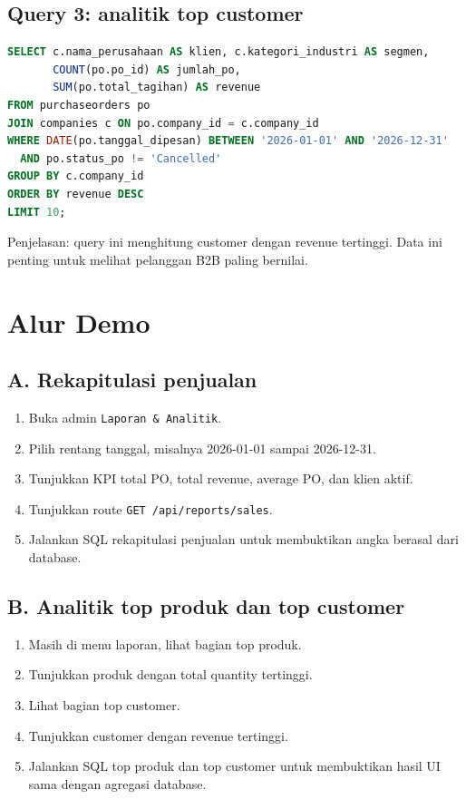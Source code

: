 \documentclass[11pt,a4paper]{article}
\begin{document}
\subsection*{Query 3: analitik top customer}
\begin{lstlisting}[language=SQL]
SELECT c.nama_perusahaan AS klien, c.kategori_industri AS segmen,
       COUNT(po.po_id) AS jumlah_po,
       SUM(po.total_tagihan) AS revenue
FROM purchaseorders po
JOIN companies c ON po.company_id = c.company_id
WHERE DATE(po.tanggal_dipesan) BETWEEN '2026-01-01' AND '2026-12-31'
  AND po.status_po != 'Cancelled'
GROUP BY c.company_id
ORDER BY revenue DESC
LIMIT 10;
\end{lstlisting}
Penjelasan: query ini menghitung customer dengan revenue tertinggi. Data ini penting untuk melihat pelanggan B2B paling bernilai.

\section*{Alur Demo}
\subsection*{A. Rekapitulasi penjualan}
\begin{enumerate}
\item Buka admin \texttt{Laporan \& Analitik}.
\item Pilih rentang tanggal, misalnya 2026-01-01 sampai 2026-12-31.
\item Tunjukkan KPI total PO, total revenue, average PO, dan klien aktif.
\item Tunjukkan route \texttt{GET /api/reports/sales}.
\item Jalankan SQL rekapitulasi penjualan untuk membuktikan angka berasal dari database.
\end{enumerate}

\subsection*{B. Analitik top produk dan top customer}
\begin{enumerate}
\item Masih di menu laporan, lihat bagian top produk.
\item Tunjukkan produk dengan total quantity tertinggi.
\item Lihat bagian top customer.
\item Tunjukkan customer dengan revenue tertinggi.
\item Jalankan SQL top produk dan top customer untuk membuktikan hasil UI sama dengan agregasi database.
\end{enumerate}
\end{document}
